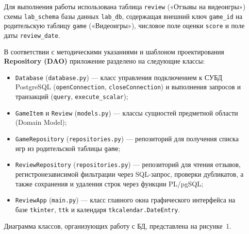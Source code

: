 \documentclass[oneside,a4paper,14pt]{extarticle}
\begin{document}
	Для выполнения работы использована таблица \texttt{review} («Отзывы на видеоигры») схемы \texttt{lab\_schema} базы данных \texttt{lab\_db}, содержащая внешний ключ \texttt{game\_id} на родительскую таблицу \texttt{game} («Видеоигры»), числовое поле оценки \texttt{score} и поле даты \texttt{review\_date}.
	
	В соответствии с методическими указаниями и шаблоном проектирования \textbf{Repository (DAO)} приложение разделено на следующие классы:
	\begin{itemize}
		\item \texttt{Database} (\texttt{database.py}) --- класс управления подключением к СУБД PostgreSQL (\texttt{openConnection}, \texttt{closeConnection}) и выполнения запросов и транзакций (\texttt{query}, \texttt{execute\_scalar});
		\item \texttt{GameItem} и \texttt{Review} (\texttt{models.py}) --- классы сущностей предметной области (Domain Model);
		\item \texttt{GameRepository} (\texttt{repositories.py}) --- репозиторий для получения списка игр из родительской таблицы \texttt{game};
		\item \texttt{ReviewRepository} (\texttt{repositories.py}) --- репозиторий для чтения отзывов, регистронезависимой фильтрации через SQL-запрос, проверки дубликатов, а также сохранения и удаления строк через функции PL/pgSQL;
		\item \texttt{ReviewApp} (\texttt{main.py}) --- класс главного окна графического интерфейса на базе \texttt{tkinter}, \texttt{ttk} и календаря \texttt{tkcalendar.DateEntry}.
	\end{itemize}
	
	Диаграмма классов, организующих работу с БД, представлена на рисунке~1.
	
\end{document}
